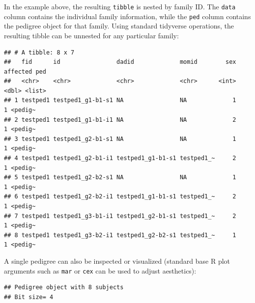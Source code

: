 \documentclass[9pt,a4paper,]{extarticle}
\newenvironment{Shaded}{\begin{snugshade}}{\end{snugshade}}
\newcommand{\DataTypeTok}[1]{\textcolor[rgb]{0.13,0.29,0.53}{#1}}
\newcommand{\DecValTok}[1]{\textcolor[rgb]{0.00,0.00,0.81}{#1}}
\newcommand{\KeywordTok}[1]{\textcolor[rgb]{0.13,0.29,0.53}{\textbf{#1}}}
\newcommand{\NormalTok}[1]{#1}
\newcommand{\OperatorTok}[1]{\textcolor[rgb]{0.81,0.36,0.00}{\textbf{#1}}}
\newcommand{\StringTok}[1]{\textcolor[rgb]{0.31,0.60,0.02}{#1}}
\begin{document}
In the example above, the resulting \texttt{tibble} is nested by family ID. The \texttt{data} column contains the individual family information, while the \texttt{ped} column contains the pedigree object for that family. Using standard tidyverse operations, the resulting tibble can be unnested for any particular family:

\begin{Shaded}
\end{Shaded}

\begin{verbatim}
## # A tibble: 8 x 7
##   fid      id                dadid             momid        sex affected ped    
##   <chr>    <chr>             <chr>             <chr>      <int>    <dbl> <list> 
## 1 testped1 testped1_g1-b1-s1 NA                NA             1        1 <pedig~
## 2 testped1 testped1_g1-b1-i1 NA                NA             2        1 <pedig~
## 3 testped1 testped1_g2-b1-s1 NA                NA             1        1 <pedig~
## 4 testped1 testped1_g2-b1-i1 testped1_g1-b1-s1 testped1_~     2        1 <pedig~
## 5 testped1 testped1_g2-b2-s1 NA                NA             1        1 <pedig~
## 6 testped1 testped1_g2-b2-i1 testped1_g1-b1-s1 testped1_~     2        1 <pedig~
## 7 testped1 testped1_g3-b1-i1 testped1_g2-b1-s1 testped1_~     2        1 <pedig~
## 8 testped1 testped1_g3-b2-i1 testped1_g2-b2-s1 testped1_~     1        1 <pedig~
\end{verbatim}

A single pedigree can also be inspected or visualized (standard base R plot arguments such as \texttt{mar} or \texttt{cex} can be used to adjust aesthetics):

\begin{Shaded}
\end{Shaded}

\begin{verbatim}
## Pedigree object with 8 subjects
## Bit size= 4
\end{verbatim}
\end{document}
